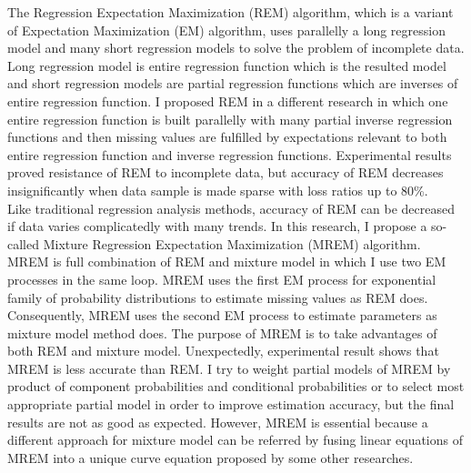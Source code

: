 \documentclass[pdftex,11pt,a4paper]{report}
\begin{document}
 

\newabstract
The Regression Expectation Maximization (REM) algorithm, which is a variant of Expectation Maximization (EM) algorithm, uses parallelly a long regression model and many short regression models to solve the problem of incomplete data. Long regression model is entire regression function which is the resulted model and short regression models are partial regression functions which are inverses of entire regression function. I proposed REM in a different research in which one entire regression function is built parallelly with many partial inverse regression functions and then missing values are fulfilled by expectations relevant to both entire regression function and inverse regression functions. Experimental results proved resistance of REM to incomplete data, but accuracy of REM decreases insignificantly when data sample is made sparse with loss ratios up to 80\%.\\
Like traditional regression analysis methods, accuracy of REM can be decreased if data varies complicatedly with many trends. In this research, I propose a so-called Mixture Regression Expectation Maximization (MREM) algorithm. MREM is full combination of REM and mixture model in which I use two EM processes in the same loop. MREM uses the first EM process for exponential family of probability distributions to estimate missing values as REM does. Consequently, MREM uses the second EM process to estimate parameters as mixture model method does. The purpose of MREM is to take advantages of both REM and mixture model. Unexpectedly, experimental result shows that MREM is less accurate than REM. I try to weight partial models of MREM by product of component probabilities and conditional probabilities or to select most appropriate partial model in order to improve estimation accuracy, but the final results are not as good as expected. However, MREM is essential because a different approach for mixture model can be referred by fusing linear equations of MREM into a unique curve equation proposed by some other researches.


\end{document}
